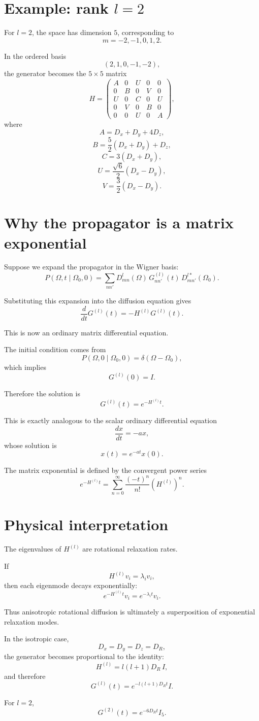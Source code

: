 \documentclass[11pt]{article}
\begin{document}
\section{Example: rank \(l=2\)}

For \(l=2\), the space has dimension \(5\), corresponding to
\[
m=-2,-1,0,1,2.
\]

In the ordered basis
\[
(2,1,0,-1,-2),
\]
the generator becomes the \(5\times5\) matrix
\[
H=
\begin{pmatrix}
A & 0 & U & 0 & 0 \\
0 & B & 0 & V & 0 \\
U & 0 & C & 0 & U \\
0 & V & 0 & B & 0 \\
0 & 0 & U & 0 & A
\end{pmatrix},
\]
where
\[
A=D_x+D_y+4D_z,
\]
\[
B=\frac52(D_x+D_y)+D_z,
\]
\[
C=3(D_x+D_y),
\]
\[
U=\frac{\sqrt6}{2}(D_x-D_y),
\]
\[
V=\frac32(D_x-D_y).
\]

\section{Why the propagator is a matrix exponential}

Suppose we expand the propagator in the Wigner basis:
\[
P(\Omega,t\mid\Omega_0,0)
=
\sum_{nn'}
D^l_{mn}(\Omega)\,
G^{(l)}_{nn'}(t)\,
D^{l*}_{mn'}(\Omega_0).
\]

Substituting this expansion into the diffusion equation gives
\[
\frac{d}{dt}G^{(l)}(t)
=
-H^{(l)}G^{(l)}(t).
\]

This is now an ordinary matrix differential equation.

The initial condition comes from
\[
P(\Omega,0\mid\Omega_0,0)=\delta(\Omega-\Omega_0),
\]
which implies
\[
G^{(l)}(0)=I.
\]

Therefore the solution is
\[
\boxed{
G^{(l)}(t)=e^{-H^{(l)}t}.
}
\]

This is exactly analogous to the scalar ordinary differential equation
\[
\frac{dx}{dt}=-ax,
\]
whose solution is
\[
x(t)=e^{-at}x(0).
\]

The matrix exponential is defined by the convergent power series
\[
e^{-H^{(l)}t}
=
\sum_{n=0}^\infty
\frac{(-t)^n}{n!}
(H^{(l)})^n.
\]

\section{Physical interpretation}

The eigenvalues of \(H^{(l)}\) are rotational relaxation rates.

If
\[
H^{(l)}v_i=\lambda_i v_i,
\]
then each eigenmode decays exponentially:
\[
e^{-H^{(l)}t}v_i=e^{-\lambda_i t}v_i.
\]

Thus anisotropic rotational diffusion is ultimately a superposition of
exponential relaxation modes.

In the isotropic case,
\[
D_x=D_y=D_z=D_R,
\]
the generator becomes proportional to the identity:
\[
H^{(l)}=l(l+1)D_R\,I,
\]
and therefore
\[
G^{(l)}(t)
=
e^{-l(l+1)D_R t}I.
\]

For \(l=2\),
\[
G^{(2)}(t)=e^{-6D_R t}I_5.
\]
\end{document}

